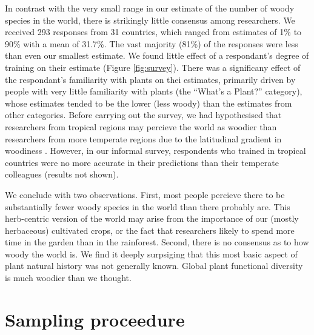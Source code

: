 \documentclass[12pt]{article}
\begin{document}
In contrast with the very small range in our estimate of the number of
woody species in the world, there is strikingly little consensus among
researchers.  We received 293 responses from 31 countries, which
ranged from estimates of 1\% to 90\% with a mean of 31.7\%.  The vast
majority (81\%) of the responses were less than even our smallest
estimate.
We found little effect of a respondant's degree of training on their
estimate (Figure \ref{fig:survey}).  There was a significany effect of
the respondant's familiarity with plants on thei estimates, primarily
driven by people with very little familiarity with plants (the
``What's a Plant?'' category), whose estimates tended to be the lower
(less woody) than the estimates from other categories.
% 
Before carrying out the survey, we had hypothesised that researchers
from tropical regions may percieve the world as woodier than
researchers from more temperate regions due to the latitudinal
gradient in woodiness \citep{Molesheihgt}.  However, in our informal
survey, respondents who trained in tropical countries were no more
accurate in their predictions than their temperate colleagues (results
not shown).

We conclude with two observations.  
%
First, most people percieve there to be substantially fewer woody
species in the world than there probably are.  This herb-centric
version of the world may arise from the importance of our (mostly
herbaceous) cultivated crops, or the fact that researchers likely to
spend more time in the garden than in the rainforest.
%
Second, there is no consensus as to how woody the world is.  We find
it deeply surpsiging that this most basic aspect of plant natural
history was not generally known.  Global plant functional diversity is
much woodier than we thought.

\clearpage
\setcounter{secnumdepth}{1}
\appendix
\section{Sampling proceedure}
\end{document}
